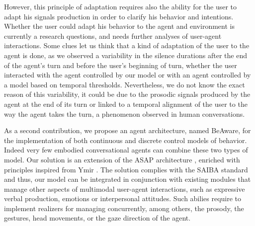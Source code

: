 However, this principle of adaptation requires also the ability for the user to adapt his signals production in order to clarify his behavior and intentions. Whether the user could adapt his behavior to the agent and environment is currently a research questions, and needs further analyses of user-agent interactions. 
Some clues let us think that a kind of adaptation of the user to the agent is done, as we observed a variability in the silence durations after the end of the agent's turn and before the user's beginning of turn, whether the user interacted with the agent controlled by our model or with an agent controlled by a model based on temporal thresholds. Nevertheless, we do not know the exact reason of this variability, it could be due to the prosodic signals produced by the agent at the end of its turn or linked to a temporal alignment of the user to the way the agent takes the turn, a phenomenon observed in human conversations. 

As a second contribution, we propose an agent architecture, named BeAware, for the implementation of both continuous and discrete control models of behavior. 
Indeed very few embodied conversational agents can combine these two types of model. 
Our solution is an extension of the ASAP architecture \cite{kopp_architecture_2014}, enriched with principles inspired from Ymir \citep{thorisson_mind_1999}. 
The solution complies with the SAIBA standard and thus, our model can be integrated in conjunction with existing modules that manage other aspects of multimodal user-agent interactions, such as expressive verbal production, emotions or interpersonal attitudes. Such abilies require to implement realizers for managing concurrently, among others, the prosody, the gestures, head movements, or the gaze direction of the agent.


